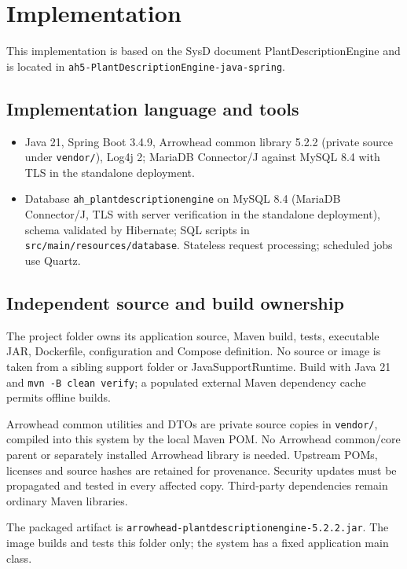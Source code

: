 \documentclass[a4paper]{arrowhead}
\begin{document}
\newpage

\section{Implementation}
\label{Implementation}

This implementation is based on the SysD document PlantDescriptionEngine \cite{pde-sysd} and is located in \texttt{ah5-PlantDescriptionEngine-java-spring}.

\subsection{Implementation language and tools}
\begin{itemize}
\item Java 21, Spring Boot 3.4.9, Arrowhead common library 5.2.2 (private source under \texttt{vendor/}), Log4j 2; MariaDB Connector/J against MySQL 8.4 with TLS in the standalone deployment.
\item Database \texttt{ah\_\allowbreak{}plantdescriptionengine} on MySQL 8.4 (MariaDB Connector/J, TLS with server verification in the standalone deployment), schema validated by Hibernate; SQL scripts in \texttt{src/\allowbreak{}main/\allowbreak{}resources/\allowbreak{}database}. Stateless request processing; scheduled jobs use Quartz.
\end{itemize}

\subsection{Independent source and build ownership}
The project folder owns its application source, Maven build, tests, executable JAR, Dockerfile, configuration and Compose definition. No source or image is taken from a sibling support folder or JavaSupportRuntime. Build with Java 21 and \texttt{mvn -B clean verify}; a populated external Maven dependency cache permits offline builds.

Arrowhead common utilities and DTOs are private source copies in \texttt{vendor/}, compiled into this system by the local Maven POM. No Arrowhead common/core parent or separately installed Arrowhead library is needed. Upstream POMs, licenses and source hashes are retained for provenance. Security updates must be propagated and tested in every affected copy. Third-party dependencies remain ordinary Maven libraries.

The packaged artifact is \texttt{arrowhead-\allowbreak{}plantdescriptionengine-5.2.2.jar}. The image builds and tests this folder only; the system has a fixed application main class.
\end{document}
